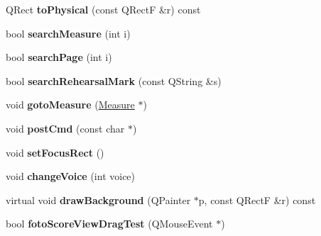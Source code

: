 \begin{DoxyCompactItemize}
\item 
\mbox{\label{class_ms_1_1_score_view_a20d65e71c08d7b5152a321d8e19b6afd}} 
Q\+Rect {\bfseries to\+Physical} (const Q\+RectF \&r) const
\item 
\mbox{\label{class_ms_1_1_score_view_a108bf7df15d3b2a06d31ba22314cb70a}} 
bool {\bfseries search\+Measure} (int i)
\item 
\mbox{\label{class_ms_1_1_score_view_a2e13d7cbff67d9b4d07ed2c4eabeae59}} 
bool {\bfseries search\+Page} (int i)
\item 
\mbox{\label{class_ms_1_1_score_view_a241c185eaedfa9b83e9eb5e195a7ce59}} 
bool {\bfseries search\+Rehearsal\+Mark} (const Q\+String \&s)
\item 
\mbox{\label{class_ms_1_1_score_view_a93abcdabfce49c3860197f5a126d4302}} 
void {\bfseries goto\+Measure} (\hyperlink{class_ms_1_1_measure}{Measure} $\ast$)
\item 
\mbox{\label{class_ms_1_1_score_view_afeb0a7eef5f516157d1920733d3e46e1}} 
void {\bfseries post\+Cmd} (const char $\ast$)
\item 
\mbox{\label{class_ms_1_1_score_view_ac8fc4dd5e390b168a3a25159c654a840}} 
void {\bfseries set\+Focus\+Rect} ()
\item 
\mbox{\label{class_ms_1_1_score_view_aa9f1f9e5918591039639de8d4d56e4cf}} 
void {\bfseries change\+Voice} (int voice)
\item 
\mbox{\label{class_ms_1_1_score_view_a757d2f7ee4f208f5b583ecf0348d506e}} 
virtual void {\bfseries draw\+Background} (Q\+Painter $\ast$p, const Q\+RectF \&r) const
\item 
\mbox{\label{class_ms_1_1_score_view_aac34a58b315971b02edf0f500247afac}} 
bool {\bfseries foto\+Score\+View\+Drag\+Test} (Q\+Mouse\+Event $\ast$)
\item 
\mbox{\label{class_ms_1_1_score_view_a074f93c948f5178f2afc2d3b6a1d83fe}} 

\end{DoxyCompactItemize}
